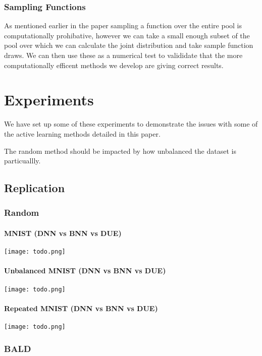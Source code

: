 \documentclass[12pt, a4paper]{report}
\theoremstyle{definition}
\begin{document}
\subsection{Sampling Functions}

As mentioned earlier in the paper sampling a function over the entire pool is computationally prohibative, however we can take a small enough subset of the pool over which we can calculate the joint distribution and take sample function draws.
We can then use these as a numerical test to valididate that the more computationally efficent methods we develop are giving correct results.


\chapter{Experiments}

We have set up some of these experiments to demonstrate the issues with some of the active learning methods detailed in this paper.

The random method should be impacted by how unbalanced the dataset is particuallly.

\section{Replication}

\subsection{Random}

\subsubsection{MNIST (DNN vs BNN vs DUE)}

\texttt{[image: todo.png]}

\subsubsection{Unbalanced MNIST (DNN vs BNN vs DUE)}

\texttt{[image: todo.png]}

\subsubsection{Repeated MNIST (DNN vs BNN vs DUE)}

\texttt{[image: todo.png]}

\subsection{BALD}
\end{document}
